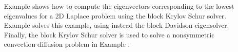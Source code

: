 Example  shows how to compute the eigenvectors
corresponding to the lowest eigenvalues for a 2D Laplace problem using the block
Krylov Schur solver.  Example  solves this example,
using instead the block Davidson eigensolver.  Finally, the block Krylov Schur
solver is used to solve a nonsymmetric convection-diffusion problem in Example
.








